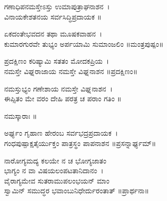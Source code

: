 ಗಣಾಧಿಪನಮಸ್ತೇಽಸ್ತು ಉಮಾಪುತ್ರಾಘನಾಶನ~।\\
ವಿನಾಯಕೇಶತನಯ ಸರ್ವಸಿದ್ಧಿಪ್ರದಾಯಕ ॥

ಏಕದಂತೇಭವದನ ತಥಾ ಮೂಷಕವಾಹನ~।\\
ಕುಮಾರಗುರವೇ ತುಭ್ಯಂ ಅರ್ಪಯಾಮಿ ಸುಮಾಂಜಲಿಂ ॥ಮಂತ್ರಪುಷ್ಪಂ॥

ಪ್ರದಕ್ಷಿಣಂ ಕರಿಷ್ಯಾಮಿ ಸತತಂ ಮೋದಕಪ್ರಿಯ~।\\
ನಮಸ್ತೇ ವಿಘ್ನರಾಜಾಯ ನಮಸ್ತೇ ವಿಘ್ನನಾಶನ ॥ಪ್ರದಕ್ಷಿಣಂ॥

ನಮಸ್ತುಭ್ಯಂ ಗಣೇಶಾಯ ನಮಸ್ತೇ ವಿಘ್ನನಾಶನ~।\\
ಈಪ್ಸಿತಂ ಮೇ ವರಂ ದೇಹಿ ಪರತ್ರ ಚ ಪರಾಂ ಗತಿಂ ॥

ನಮಸ್ಕಾರಾಃ ॥

ಅರ್ಘ್ಯಂ ಗೃಹಾಣ ಹೇರಂಬ ಸರ್ವಭದ್ರಪ್ರದಾಯಕ~।\\
ಗಂಧಪುಷ್ಪಾಕ್ಷತೈರ್ಯುಕ್ತಂ ಪಾತ್ರಸ್ಥಂ ಪಾಪನಾಶನ ॥ಪ್ರಸನ್ನಾರ್ಘ್ಯಮ್॥

ನಾರೋಗ್ಯಮದ್ಯ ಕಲಯೇ ನ ಚ ಭೋಗ್ಯಜಾತಂ\\
ಭಾಗ್ಯಂ ನ ವಾ ವಿಷಯಲಂಪಟತಾನಿದಾನಂ~।\\
ವೈರಾಗ್ಯಮೇವ ಸುತರಾಮುಪಲಂಭಯನ್ ಮಾಂ\\
ಸ್ವಾಮಿನ್ ಸಮುದ್ಧರ ಭವಾಂಬುನಿಧೇರ್ದುರಂತಾತ್ ॥ಪ್ರಾರ್ಥನಾ॥
\newpage
